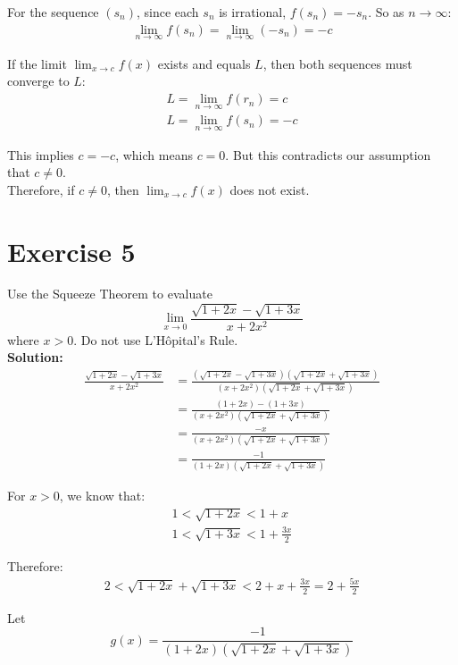 \documentclass{article}
\begin{document}
For the sequence $(s_n)$, since each $s_n$ is irrational, $f(s_n) = -s_n$. So as $n \to \infty$:
\begin{align*}
\lim_{n \to \infty} f(s_n) = \lim_{n \to \infty} (-s_n) = -c
\end{align*}

If the limit $\lim_{x \to c} f(x)$ exists and equals $L$, then both sequences must converge to $L$:
\begin{align*}
L = \lim_{n \to \infty} f(r_n) = c\\
L = \lim_{n \to \infty} f(s_n) = -c
\end{align*}

This implies $c = -c$, which means $c = 0$. But this contradicts our assumption that $c \neq 0$. \\

Therefore, if $c \neq 0$, then $\lim_{x \to c} f(x)$ does not exist.

\newpage

\section*{Exercise 5}
Use the Squeeze Theorem to evaluate
$$\lim_{x \to 0} \frac{\sqrt{1 + 2x} - \sqrt{1 + 3x}}{x + 2x^2}$$
where $x > 0$. Do not use L'Hôpital's Rule. \\

\textbf{Solution: }
\begin{align*}
\frac{\sqrt{1 + 2x} - \sqrt{1 + 3x}}{x + 2x^2} &= \frac{(\sqrt{1 + 2x} - \sqrt{1 + 3x})(\sqrt{1 + 2x} + \sqrt{1 + 3x})}{(x + 2x^2)(\sqrt{1 + 2x} + \sqrt{1 + 3x})} \\
&= \frac{(1 + 2x) - (1 + 3x)}{(x + 2x^2)(\sqrt{1 + 2x} + \sqrt{1 + 3x})} \\
&= \frac{-x}{(x + 2x^2)(\sqrt{1 + 2x} + \sqrt{1 + 3x})} \\
&= \frac{-1}{(1 + 2x)(\sqrt{1 + 2x} + \sqrt{1 + 3x})}
\end{align*}

For $x > 0$, we know that:
\begin{align*}
1 < \sqrt{1 + 2x} < 1 + x \\
1 < \sqrt{1 + 3x} < 1 + \frac{3x}{2}
\end{align*}

Therefore:
\begin{align*}
2 < \sqrt{1 + 2x} + \sqrt{1 + 3x} < 2 + x + \frac{3x}{2} = 2 + \frac{5x}{2}
\end{align*}

Let $$g(x) = \frac{-1}{(1 + 2x)(\sqrt{1 + 2x} + \sqrt{1 + 3x})}$$
\end{document}
